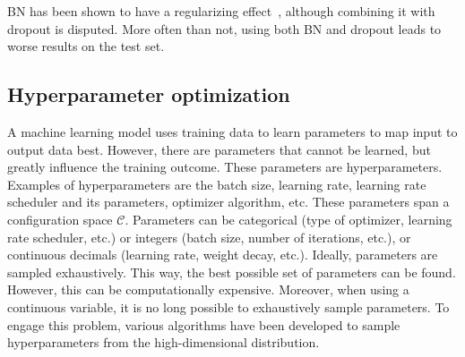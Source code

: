 BN has been shown to have a regularizing effect~, although combining it with dropout is disputed.
More often than not, using both BN and dropout leads to worse results on the test set.



\subsection{Hyperparameter optimization}\label{sec:hparam}

A machine learning model uses training data to learn parameters to map input to output data best.
However, there are parameters that cannot be learned, but greatly influence the training outcome.
These parameters are hyperparameters.
Examples of hyperparameters are the batch size, learning rate, learning rate scheduler and its parameters, optimizer algorithm, etc.
These parameters span a configuration space $\mathcal{C}$.
Parameters can be categorical (type of optimizer, learning rate scheduler, etc.) or integers (batch size, number of iterations, etc.), or continuous decimals (learning rate, weight decay, etc.).
Ideally, parameters are sampled exhaustively.
This way, the best possible set of parameters can be found.
However, this can be computationally expensive.
Moreover, when using a continuous variable, it is no long possible to exhaustively sample parameters.
To engage this problem, various algorithms have been developed to sample hyperparameters from the high-dimensional distribution.


